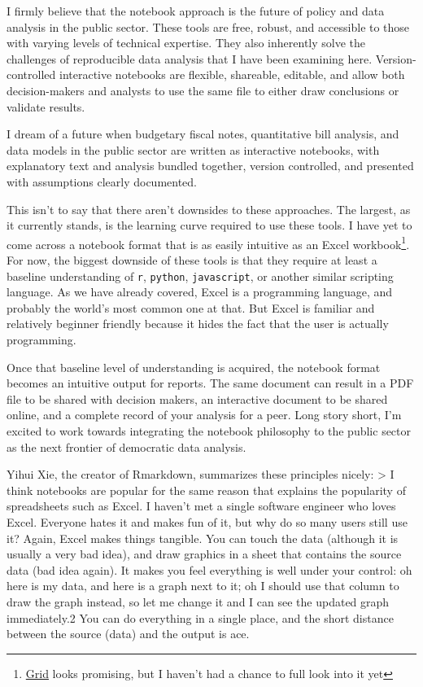 \documentclass[
]{book}
\begin{document}
I firmly believe that the notebook approach is the future of policy and data analysis in the public sector. These tools are free, robust, and accessible to those with varying levels of technical expertise. They also inherently solve the challenges of reproducible data analysis that I have been examining here. Version-controlled interactive notebooks are flexible, shareable, editable, and allow both decision-makers and analysts to use the same file to either draw conclusions or validate results.

I dream of a future when budgetary fiscal notes, quantitative bill analysis, and data models in the public sector are written as interactive notebooks, with explanatory text and analysis bundled together, version controlled, and presented with assumptions clearly documented.

This isn't to say that there aren't downsides to these approaches. The largest, as it currently stands, is the learning curve required to use these tools. I have yet to come across a notebook format that is as easily intuitive as an Excel workbook\footnote{\href{https://beta.grid.is/@grid/what-is-grid-yBYeOyirSSKBlknj25F98A}{Grid} looks promising, but I haven't had a chance to full look into it yet}. For now, the biggest downside of these tools is that they require at least a baseline understanding of \texttt{r}, \texttt{python}, \texttt{javascript}, or another similar scripting language. As we have already covered, Excel is a programming language, and probably the world's most common one at that. But Excel is familiar and relatively beginner friendly because it hides the fact that the user is actually programming.

Once that baseline level of understanding is acquired, the notebook format becomes an intuitive output for reports. The same document can result in a PDF file to be shared with decision makers, an interactive document to be shared online, and a complete record of your analysis for a peer. Long story short, I'm excited to work towards integrating the notebook philosophy to the public sector as the next frontier of democratic data analysis.

Yihui Xie, the creator of Rmarkdown, summarizes these principles nicely:
\textgreater{} I think notebooks are popular for the same reason that explains the popularity of spreadsheets such as Excel. I haven't met a single software engineer who loves Excel. Everyone hates it and makes fun of it, but why do so many users still use it? Again, Excel makes things tangible. You can touch the data (although it is usually a very bad idea), and draw graphics in a sheet that contains the source data (bad idea again). It makes you feel everything is well under your control: oh here is my data, and here is a graph next to it; oh I should use that column to draw the graph instead, so let me change it and I can see the updated graph immediately.2 You can do everything in a single place, and the short distance between the source (data) and the output is ace.
\end{document}
